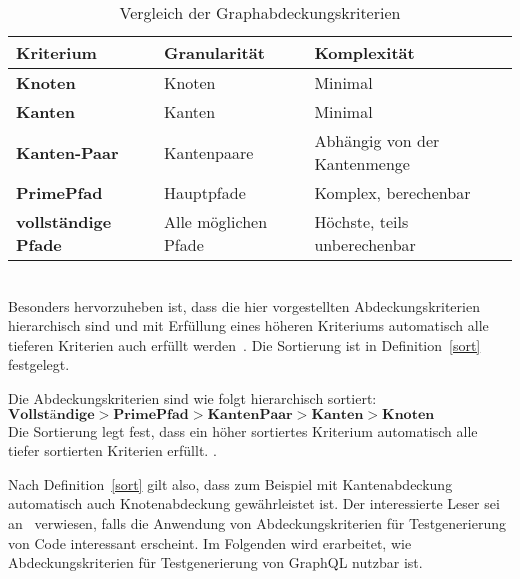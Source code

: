 \begin{center}
    \begin{table}[!ht]
        \begin{tabularx}{\textwidth}{|C|C|C|}
            \hline
            \textbf{Kriterium} & \textbf{Granularität} & \textbf{Komplexität} \\
            \hline
            \textbf{Knoten} & Knoten & Minimal \\
            \hline
            \textbf{Kanten} & Kanten & Minimal \\
            \hline
            \textbf{Kanten-Paar} & Kantenpaare & Abhängig von der Kantenmenge \\
            \hline
            \textbf{PrimePfad} & Hauptpfade & Komplex, berechenbar \\
            \hline
            \textbf{vollständige Pfade} & Alle möglichen Pfade & Höchste, teils unberechenbar \\
            \hline
        \end{tabularx}
        \caption{Vergleich der Graphabdeckungskriterien}
    \end{table}
\end{center}
\\

Besonders hervorzuheben ist, dass die hier vorgestellten Abdeckungskriterien hierarchisch sind und mit Erfüllung eines höheren Kriteriums automatisch alle tieferen Kriterien auch erfüllt werden~\cite[vgl. Figure 2.15]{software-testing}.
Die Sortierung ist in Definition~\ref{sort} festgelegt. \\
\begin{definition}
    Die Abdeckungskriterien sind wie folgt hierarchisch sortiert: \\
    $ \textbf{Vollständige} > \textbf{PrimePfad} > \textbf{KantenPaar} > \textbf{Kanten} > \textbf{Knoten} $ \\
    Die Sortierung legt fest, dass ein höher sortiertes Kriterium automatisch alle tiefer sortierten Kriterien erfüllt.
    \cite[vgl. Figure 2.15]{software-testing}.
    \label{sort}
\end{definition}

Nach Definition~\ref{sort} gilt also, dass zum Beispiel mit Kantenabdeckung automatisch auch Knotenabdeckung gewährleistet ist.
Der interessierte Leser sei an~\cite{software-testing} verwiesen, falls die Anwendung von Abdeckungskriterien für Testgenerierung von Code interessant erscheint.
Im Folgenden wird erarbeitet, wie Abdeckungskriterien für Testgenerierung von GraphQL nutzbar ist.